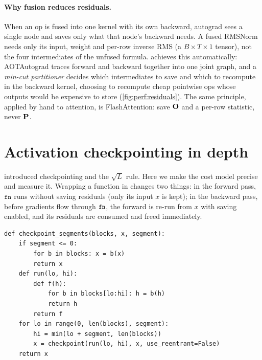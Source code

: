 \paragraph{Why fusion reduces residuals.} When an op is fused into one kernel with its own
backward, autograd sees a single node and saves only what that node's backward needs. A fused
RMSNorm needs only its input, weight and per-row inverse RMS (a $B\times T\times1$ tensor), not
the four intermediates of the unfused formula.  achieves this automatically:
AOTAutograd traces forward and backward together into one joint graph, and a \emph{min-cut
partitioner} decides which intermediates to save and which to recompute in the backward kernel,
choosing to recompute cheap pointwise ops whose outputs would be expensive to store
(\cref{fig:perf:residuals}). The same principle, applied by hand to attention, is FlashAttention:
save $\mathbf{O}$ and a per-row statistic, never $\mathbf{P}$.

\section{Activation checkpointing in depth}\label{sec:perf:ckpt}

 introduced checkpointing and the $\sqrt L$ rule. Here we make the
cost model precise and measure it. Wrapping a function in
 changes two things: in the
forward pass, $\texttt{\small fn}$ runs without saving residuals (only its input $x$ is kept); in the backward
pass, before gradients flow through $\texttt{\small fn}$, the forward is re-run from $x$ with saving enabled,
and its residuals are consumed and freed immediately.

\begin{lstlisting}[caption={Checkpointing groups of blocks (from \texttt{llmsys/perf.py}).},label={lst:perf:ckptseg}]
def checkpoint_segments(blocks, x, segment):
    if segment <= 0:
        for b in blocks: x = b(x)
        return x
    def run(lo, hi):
        def f(h):
            for b in blocks[lo:hi]: h = b(h)
            return h
        return f
    for lo in range(0, len(blocks), segment):
        hi = min(lo + segment, len(blocks))
        x = checkpoint(run(lo, hi), x, use_reentrant=False)
    return x
\end{lstlisting}

